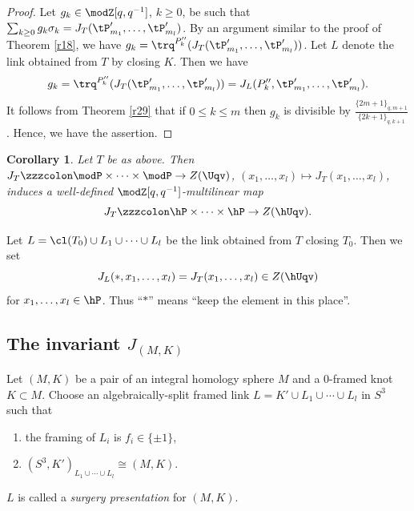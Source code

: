 \documentclass{amsart}
\numberwithin{equation}{section}
\numberwithin{figure}{section}
\theoremstyle{plain}
\newtheorem{corollary}[theorem]{Corollary}
\theoremstyle{definition}
\theoremstyle{remark}
\begin{document}
\begin{proof}
  Let $g_k\in \modZ [q,q^{-1}]$, $k\ge 0$, be such that
  $\sum_{k\ge 0}g_k\sigma _k=J_T(\tP'_{m_1},\ldots,\tP'_{m_l})$.  By an argument
  similar to the proof of Theorem \ref{r18}, we have
  $g_k=\trq^{P''_k}(J_T(\tP'_{m_1},\ldots,\tP'_{m_l}))$.  Let $L$ denote
  the link obtained from $T$ by closing $K$.  Then we have
  \begin{equation*}
    g_k=\trq^{P''_k}(J_T(\tP'_{m_1},\ldots,\tP'_{m_l}))=J_L(P''_k,\tP'_{m_1},\ldots,\tP'_{m_l}).
  \end{equation*}
  It follows from Theorem \ref{r29} that if $0\le k\le m$ then $g_k$ is
  divisible by $\frac{\{2m+1\}_{q,m+1}}{\{2k+1\}_{q,k+1}}$.  Hence, we
  have the assertion.
\end{proof}

\begin{corollary}
  \label{r77}
  Let $T$ be as above.  Then $J_T\zzzcolon \modP \times \cdots\times \modP \rightarrow Z(\Uqv)$,
  $(x_1,\ldots,x_l)\mapsto J_T(x_1,\ldots,x_l)$, induces a well-defined
  $\modZ [q,q^{-1}]$-multilinear map
  \begin{equation*}
    J_T\zzzcolon \hP\times \cdots\times \hP\rightarrow Z(\hUqv).
  \end{equation*}
\end{corollary}

Let $L=\cl(T_0)\cup L_1\cup \cdots\cup L_l$ be the link obtained from $T$ closing
$T_0$.  Then we set
\begin{equation*}
  J_L(*,x_1,\ldots,x_l)=J_T(x_1,\ldots,x_l)\in Z(\hUqv)
\end{equation*}
for $x_1,\ldots,x_l\in \hP$.  Thus ``$*$'' means ``keep the element in this
place''.

\subsection{The invariant $J_{(M,K)}$}
\label{sec:invariant-jm-k}

Let $(M,K)$ be a pair of an integral homology sphere $M$ and a
$0$-framed knot $K\subset M$.  Choose an algebraically-split framed link
$L=K'\cup L_1\cup \cdots\cup L_l$ in $S^3$ such that
\begin{enumerate}
\item the framing of $L_i$ is $f_i\in \{\pm 1\}$,
\item $(S^3,K')_{L_1\cup \cdots\cup L_l}\cong (M,K)$.
\end{enumerate}
$L$ is called a {\em surgery presentation} for $(M,K)$.
\end{document}
